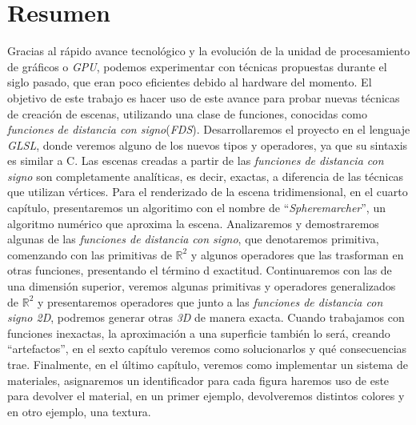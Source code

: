 \thispagestyle{empty}

\chapter*{Resumen}

Gracias al rápido avance tecnológico y la evolución de la unidad de procesamiento de gráficos o \textit{GPU}, podemos experimentar con técnicas propuestas durante el siglo pasado, que eran poco eficientes debido al hardware del momento. El objetivo de este trabajo es hacer uso de este avance para probar nuevas técnicas de creación de escenas, utilizando una clase de funciones, conocidas como \textit{funciones de distancia con signo}(\textit{FDS}). Desarrollaremos el proyecto en el lenguaje \textit{GLSL}, donde veremos alguno de los nuevos tipos y operadores, ya que su sintaxis es similar a C. Las escenas creadas a partir de las \textit{funciones de distancia con signo} son completamente analíticas, es decir, exactas, a diferencia de las técnicas que utilizan vértices. Para el renderizado de la escena tridimensional, en el cuarto capítulo, presentaremos un algoritimo con el nombre de \enquote{\textit{Spheremarcher}}, un algoritmo numérico que aproxima la escena. Analizaremos y demostraremos algunas de las \textit{funciones de distancia con signo}, que denotaremos primitiva, comenzando con las primitivas de \(\mathbb{R}^2\) y algunos operadores que las trasforman en otras funciones, presentando el término d exactitud. Continuaremos con las de una dimensión superior, veremos algunas primitivas y operadores generalizados de \(\mathbb{R}^2\) y presentaremos operadores que junto a las \textit{funciones de distancia con signo 2D}, podremos generar otras \textit{3D} de manera exacta. Cuando trabajamos con funciones inexactas, la aproximación a una superficie también lo será, creando \enquote{artefactos}, en el sexto capítulo veremos como solucionarlos y qué consecuencias trae. Finalmente, en el último capítulo, veremos como implementar un sistema de materiales, asignaremos un identificador para cada figura haremos uso de este para devolver el material, en un primer ejemplo, devolveremos distintos colores y en otro ejemplo, una textura.

\vspace{0.7cm}


\cleardoublepage

